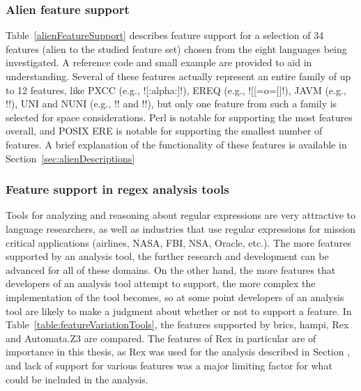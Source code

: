 

\subsubsection{Alien feature support}
Table~\ref{alienFeatureSupport} describes feature support for a selection of 34 features (alien to the studied feature set) chosen from the eight languages being investigated.  A reference code and small example are provided to aid in understanding.  Several of these features actually represent an entire family of up to 12 features, like PXCC (e.g., \cverb![:alpha:]!), EREQ (e.g., \cverb![[=o=]]!), JAVM (e.g., \cverb!!), UNI and NUNI (e.g., \cverb!\pL! and \cverb!\PM!), but only one feature from such a family is selected for space considerations.  Perl is notable for supporting the most features overall, and POSIX ERE is notable for supporting the smallest number of features.  A brief explanation of the functionality of these features is available in Section~\ref{sec:alienDescriptions}



\subsubsection{Feature support in regex analysis tools}
\label{sec:featureVariationTools}
Tools for analyzing and reasoning about regular expressions are very attractive to language researchers, as well as industries that use regular expressions for mission critical applications (airlines, NASA, FBI, NSA, Oracle, etc.).  The more features supported by an analysis tool, the further research and development can be advanced for all of these domains.  On the other hand, the more features that developers of an analysis tool attempt to support, the more complex the implementation of the tool becomes, so at some point developers of an analysis tool are likely to make a judgment about whether or not to support a feature.  In Table~\ref{table:featureVariationTools}, the features supported by brics, hampi, Rex and Automata.Z3 are compared.  The features of Rex in particular are of importance in this thesis, as Rex was used for the analysis described in Section , and lack of support for various features was a major limiting factor for what could be included in the analysis.

